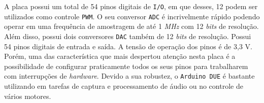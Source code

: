 A placa possui um total de 54 pinos digitais de \texttt{I/O}, em que desses, 12 podem ser utilizados como controle \texttt{PWM}. O seu conversor 
\texttt{ADC} é incrivelmente rápido podendo operar em uma frequência de amostragem de até 1 \textit{MHz} com 12 \textit{bits} de resolução. Além disso, possui 
dois conversores \texttt{DAC} também de 12 \textit{bits} de resolução. Possui 54 pinos digitais de entrada e saída. A tensão de operação dos pinos é de 3,3 V. 
Porém, uma das característica que mais despertou atenção nesta placa é a possibilidade de configurar praticamente todos os seus pinos para 
trabalharem com interrupções de \textit{hardware}. Devido a sua robustez, o \texttt{Arduino DUE} é bastante utilizando em tarefas de captura e processamento de 
áudio ou no controle de vários motores.

